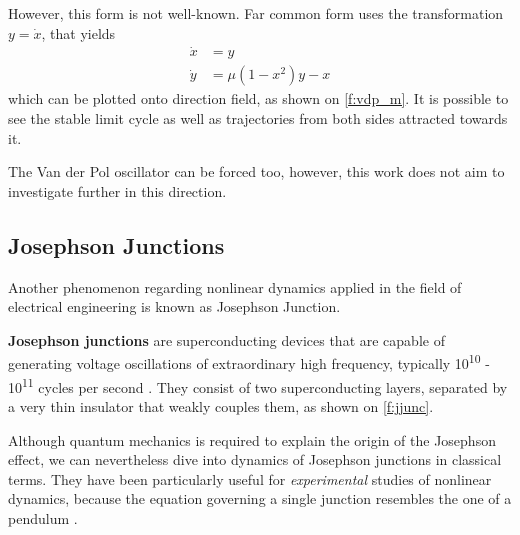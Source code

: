 \documentclass[journal]{IEEEtran}
\begin{document}
However, this form is not well-known. Far common form uses the transformation $y=\dot x$, that yields
\begin{align*}
\dot x &= y \\
\dot y &= \mu\left(1-x^2\right)y-x
\end{align*}
which can be plotted onto direction field, as shown on \cref{f:vdp_m}. It is possible to see the stable limit cycle as well as trajectories from both sides attracted towards it.

The Van der Pol oscillator can be forced too, however, this work does not aim to investigate further in this direction.


\subsection{Josephson Junctions}
Another phenomenon regarding nonlinear dynamics applied in the field of electrical engineering is known as Josephson Junction.

\textbf{Josephson junctions} are superconducting devices that are capable of generating voltage oscillations of extraordinary high frequency, typically 10\textsuperscript{10} - 10\textsuperscript{11} cycles per second \cite{van1981principles}. They consist of two superconducting layers, separated by a very thin insulator that weakly couples them, as shown on \cref{f:jjunc}.


Although quantum mechanics is required to explain the origin of the Josephson effect, we can nevertheless dive into dynamics of Josephson junctions in classical terms. They have been particularly useful for \textit{experimental} studies of nonlinear dynamics, because the equation governing a single junction resembles the one of a pendulum \cite{strogatz1994nonlinear}.
\end{document}
